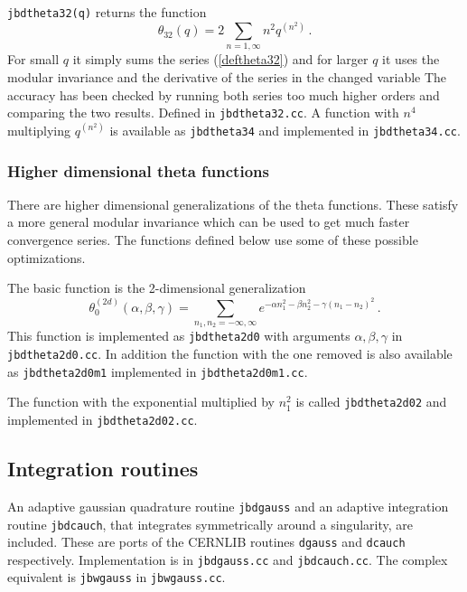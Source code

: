 \documentclass[12pt,a4paper]{article}
\begin{document}
\texttt{jbdtheta32(q)} returns the function
\begin{equation}
\label{deftheta32}
\theta_{32}(q) = 2\sum_{n=1,\infty}n^2 q^{(n^2)}\,.
\end{equation}
For small $q$ it simply sums the series (\ref{deftheta32}) and for
larger $q$ it uses the modular invariance and the derivative
of the series in the changed variable
The accuracy has been checked by running both series too much higher
orders and comparing the two results. Defined in \texttt{jbdtheta32.cc}.
A function with $n^4$ multiplying $q^{(n^2)}$ is available
as \texttt{jbdtheta34} and implemented in \texttt{jbdtheta34.cc}.

\subsubsection{Higher dimensional theta functions}
 
There are higher dimensional generalizations of the theta functions.
These satisfy a more general modular invariance which can be used
to get much faster convergence series. The functions defined below use
some of these possible optimizations.

The basic function is the 2-dimensional generalization
\begin{equation}
\theta^{(2d)}_{0}(\alpha,\beta,\gamma) = \sum_{n_1,n_2=-\infty,\infty}
e^{-\alpha n_1^2-\beta n_2^2-\gamma (n_1-n_2)^2}\,.
\end{equation}
This function is implemented as \texttt{jbdtheta2d0} with arguments
$\alpha,\beta,\gamma$  in \texttt{jbdtheta2d0.cc}.
In addition the function with the one removed is also
available as \texttt{jbdtheta2d0m1}
implemented in \texttt{jbdtheta2d0m1.cc}.

The function with the exponential multiplied by $n_1^2$ is
called \texttt{jbdtheta2d02} and implemented in \texttt{jbdtheta2d02.cc}.


\subsection{Integration routines}

An adaptive gaussian quadrature routine \texttt{jbdgauss} and an adaptive
integration routine \texttt{jbdcauch}, that integrates symmetrically
around a singularity, are included.
These are ports of the {\textsc CERNLIB} routines
\texttt{dgauss} and \texttt{dcauch} respectively. Implementation is in
\texttt{jbdgauss.cc} and \texttt{jbdcauch.cc}. The complex equivalent is
\texttt{jbwgauss} in \texttt{jbwgauss.cc}.
\end{document}
